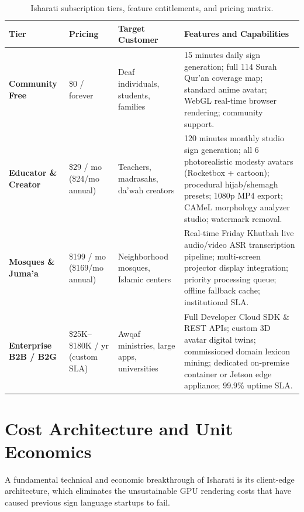 \begin{table}[ht]
\centering\small
\caption{Isharati subscription tiers, feature entitlements, and pricing matrix.}
\label{tab:pricing_tiers}
\begin{tabularx}{\textwidth}{L{2.2cm} L{2.2cm} L{3.0cm} Y}
\toprule
Tier & Pricing & Target Customer & Features and Capabilities \\
\midrule
\textbf{Community Free} & \$0 / forever & Deaf individuals, students, families & 15 minutes daily sign generation; full 114 Surah Qur'an coverage map; standard anime avatar; WebGL real-time browser rendering; community support. \\
\midrule
\textbf{Educator \& Creator} & \$29 / mo (\$24/mo annual) & Teachers, madrasahs, da'wah creators & 120 minutes monthly studio sign generation; all 6 photorealistic modesty avatars (Rocketbox + cartoon); procedural hijab/shemagh presets; 1080p MP4 export; CAMeL morphology analyzer studio; watermark removal. \\
\midrule
\textbf{Mosques \& Juma'a} & \$199 / mo (\$169/mo annual) & Neighborhood mosques, Islamic centers & Real-time Friday Khutbah live audio/video ASR transcription pipeline; multi-screen projector display integration; priority processing queue; offline fallback cache; institutional SLA. \\
\midrule
\textbf{Enterprise B2B / B2G} & \$25K--\$180K / yr (custom SLA) & Awqaf ministries, large apps, universities & Full Developer Cloud SDK \& REST APIs; custom 3D avatar digital twins; commissioned domain lexicon mining; dedicated on-premise container or Jetson edge appliance; 99.9\% uptime SLA. \\
\bottomrule
\end{tabularx}
\end{table}

\section{Cost Architecture and Unit Economics}
\label{sec:biz_economics}
A fundamental technical and economic breakthrough of Isharati is its client-edge architecture, which eliminates the unsustainable GPU rendering costs that have caused previous sign language startups to fail.

